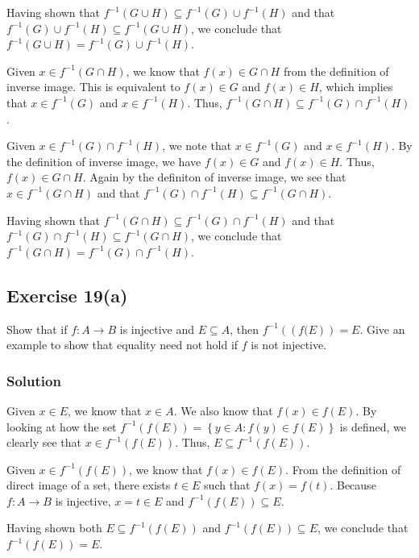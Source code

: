 \documentclass[12pt]{article}
\begin{document}
Having shown that $f^{-1}\left(G \cup H\right) \subseteq f^{-1}(G) \cup f^{-1}(H)$ and that $f^{-1}(G) \cup f^{-1}(H) \subseteq f^{-1}\left(G \cup H\right)$, we conclude that $f^{-1}\left(G \cup H\right) = f^{-1}(G) \cup f^{-1}(H)$.


Given $x \in f^{-1}\left(G \cap H\right)$, we know that $f\left(x\right) \in G \cap H$ from the definition of inverse image. This is equivalent to $f(x) \in G$ and $f(x) \in H$, which implies that $x \in f^{-1}(G)$ and $x \in f^{-1}(H)$. Thus, $f^{-1}\left(G \cap H\right) \subseteq f^{-1}(G) \cap f^{-1}(H)$.

Given $x \in f^{-1}(G) \cap f^{-1}(H)$, we note that $x \in f^{-1}(G)$ and $x \in f^{-1}(H)$. By the definition of inverse image, we have $f(x) \in G$ and $f(x) \in H$. Thus, $f(x) \in G \cap H$. Again by the definiton of inverse image, we see that $x \in f^{-1}\left(G \cap H\right)$ and that $f^{-1}(G) \cap f^{-1}(H) \subseteq f^{-1}\left(G \cap H\right)$.

Having shown that $f^{-1}\left(G \cap H\right) \subseteq f^{-1}(G) \cap f^{-1}(H)$ and that $f^{-1}(G) \cap f^{-1}(H) \subseteq f^{-1}\left(G \cap H\right)$, we conclude that $f^{-1}\left(G \cap H\right) = f^{-1}(G) \cap f^{-1}(H)$.

\subsection*{Exercise 19(a)}
Show that if $f : A \to B$ is injective and $E \subseteq A$, then $f^{-1}\left(\left(f(E\right)\right) = E$. Give an example to show that equality need not hold if $f$ is not injective.
\subsubsection*{Solution}
Given $x \in E$, we know that $x \in A$. We also know that $f(x) \in f(E)$. By looking at how the set $f^{-1}\left(f\left(E\right)\right) = \left\{y \in A : f(y) \in f(E)\right\}$ is defined, we clearly see that $x \in f^{-1}\left(f(E)\right)$. Thus, $E \subseteq f^{-1}\left(f(E)\right)$.

Given $x \in f^{-1}\left(f(E)\right)$, we know that $f(x) \in f(E)$. From the definition of direct image of a set, there exists $t \in E$ such that $f(x) = f(t)$. Because $f : A \to B$ is injective, $x = t \in E$ and $f^{-1}(f(E)) \subseteq E$.

Having shown both $E \subseteq f^{-1}\left(f(E)\right)$ and $f^{-1}(f(E)) \subseteq E$, we conclude that $f^{-1}(f(E)) = E$.
\end{document}
